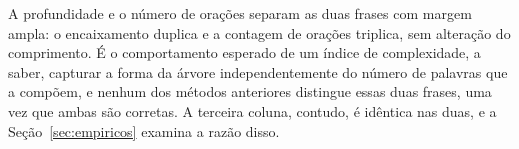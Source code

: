 \begin{table}[H]
\centering
{}
\caption{Os três índices sobre duas frases de mesmo comprimento.}
\label{tab:complexidade}
\end{table}

A profundidade e o número de orações separam as duas frases com margem ampla: o encaixamento
duplica e a contagem de orações triplica, sem alteração do comprimento. É o comportamento
esperado de um índice de complexidade, a saber, capturar a forma da árvore independentemente
do número de palavras que a compõem, e nenhum dos métodos anteriores distingue essas duas
frases, uma vez que ambas são corretas. A terceira coluna, contudo, é idêntica nas duas, e a
Seção~\ref{sec:empiricos} examina a razão disso.
